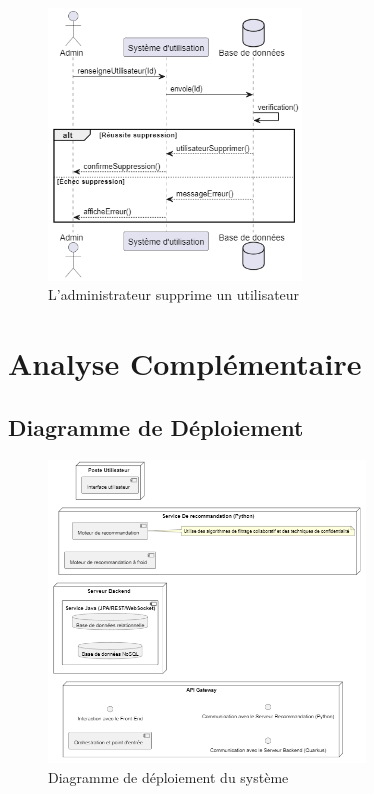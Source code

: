 \documentclass{article}
\begin{document}
\begin{figure}[H]
    \centering
    \includegraphics[width=0.6\textwidth]{images/sequence/admin/seq_admin_3.png}
    \caption{L'administrateur supprime un utilisateur}
\end{figure}

\section{Analyse Complémentaire}
\subsection{Diagramme de Déploiement}
\begin{figure}[H]
    \centering
    \includegraphics[width=0.75\textwidth]{images/deploiement/deploiement.png}
    \caption{Diagramme de déploiement du système}
\end{figure}
\end{document}
